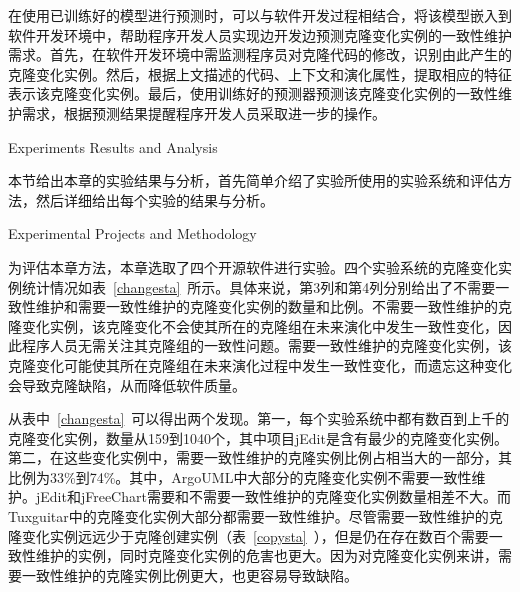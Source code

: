 在使用已训练好的模型进行预测时，可以与软件开发过程相结合，将该模型嵌入到软件开发环境中，帮助程序开发人员实现边开发边预测克隆变化实例的一致性维护需求。首先，在软件开发环境中需监测程序员对克隆代码的修改，识别由此产生的克隆变化实例。然后，根据上文描述的代码、上下文和演化属性，提取相应的特征表示该克隆变化实例。最后，使用训练好的预测器预测该克隆变化实例的一致性维护需求，根据预测结果提醒程序开发人员采取进一步的操作。



{Experiments Results and Analysis}

本节给出本章的实验结果与分析，首先简单介绍了实验所使用的实验系统和评估方法，然后详细给出每个实验的结果与分析。

{Experimental Projects and Methodology}

为评估本章方法，本章选取了四个开源软件进行实验。四个实验系统的克隆变化实例统计情况如表~\ref{changesta}~所示。具体来说，第3列和第4列分别给出了不需要一致性维护和需要一致性维护的克隆变化实例的数量和比例。不需要一致性维护的克隆变化实例，该克隆变化不会使其所在的克隆组在未来演化中发生一致性变化，因此程序人员无需关注其克隆组的一致性问题。需要一致性维护的克隆变化实例，该克隆变化可能使其所在克隆组在未来演化过程中发生一致性变化，而遗忘这种变化会导致克隆缺陷，从而降低软件质量。

从表中~\ref{changesta}~可以得出两个发现。第一，每个实验系统中都有数百到上千的克隆变化实例，数量从159到1040个，其中项目{jEdit}是含有最少的克隆变化实例。第二，在这些变化实例中，需要一致性维护的克隆实例比例占相当大的一部分，其比例为33\%到74\%。其中，ArgoUML中大部分的克隆变化实例不需要一致性维护。jEdit和jFreeChart需要和不需要一致性维护的克隆变化实例数量相差不大。而Tuxguitar中的克隆变化实例大部分都需要一致性维护。尽管需要一致性维护的克隆变化实例远远少于克隆创建实例（表~\ref{copysta}~），但是仍在存在数百个需要一致性维护的实例，同时克隆变化实例的危害也更大。因为对克隆变化实例来讲，需要一致性维护的克隆实例比例更大，也更容易导致缺陷。

